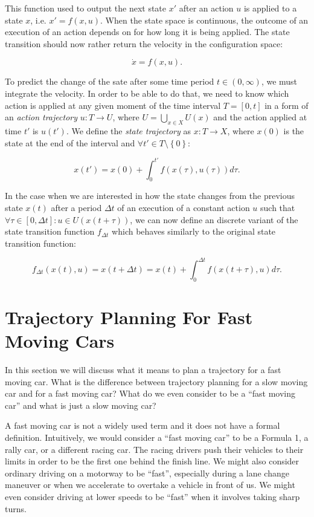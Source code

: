 This function used to output the next state $x'$ after an action $u$ is applied to a state $x$, i.e. $x'=f(x, u)$. When the state space is continuous, the outcome of an execution of an action depends on for how long it is being applied. The state transition should now rather return the velocity in the configuration space:

\[
	\dot{x}=f(x, u).
\]

To predict the change of the sate after some time period $t\in(0,\infty)$, we must integrate the velocity. In order to be able to do that, we need to know which action is applied at any given moment of the time interval $T=[0, t]$ in a form of an \textit{action trajectory} $u: T \rightarrow U$, where $U=\bigcup\limits_{x\in X} U(x)$ and the action applied at time $t'$ is $u(t')$. We define the \textit{state trajectory} as $x: T \rightarrow X$, where $x(0)$ is the state at the end of the interval and $\forall t' \in T \setminus \left\{0\right\}$:

\[
	x(t')=x(0)+\int_{0}^{t'} f(x(\tau), u(\tau)) d\tau.
\]


In the case when we are interested in how the state changes from the previous state $x(t)$ after a period $\Delta t$ of an execution of a constant action $u$ such that $\forall \tau \in \left[0, \Delta t\right]: u\in U(x(t + \tau))$, we can now define an discrete variant of the state transition function $f_{\Delta t}$ which behaves similarly to the original state transition function:

\[
f_{\Delta t}\left(x(t),u\right)=x(t+\Delta t)=x(t) + \int_{0}^{\Delta t} f\left(x(t+\tau),u \right) d\tau.
\]

\section{Trajectory Planning For Fast Moving Cars}

In this section we will discuss what it means to plan a trajectory for a fast moving car. What is the difference between trajectory planning for a slow moving car and for a fast moving car? What do we even consider to be a ``fast moving car'' and what is just a slow moving car?

A fast moving car is not a widely used term and it does not have a formal definition. Intuitively, we would consider a ``fast moving car'' to be a Formula 1, a rally car, or a different racing car. The racing drivers push their vehicles to their limits in order to be the first one behind the finish line. We might also consider ordinary driving on a motorway to be ``fast'', especially during a lane change maneuver or when we accelerate to overtake a vehicle in front of us. We might even consider driving at lower speeds to be ``fast'' when it involves taking sharp turns.

